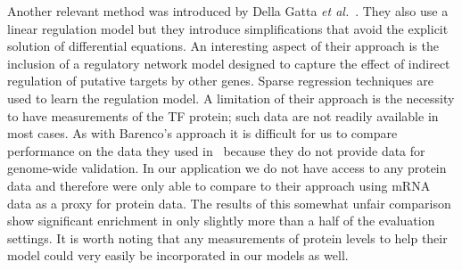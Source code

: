 \documentclass{pnastwo}
\begin{document}
\begin{article}
Another relevant method was introduced by Della Gatta {\em et
  al.}~\cite{Gatta2008}. They also use a linear regulation model but
they introduce simplifications that avoid the explicit solution of
differential equations. An interesting aspect of their approach is the
inclusion of a regulatory network model designed to capture the effect
of indirect regulation of putative targets by other genes. Sparse regression
techniques are used to learn the regulation model. A limitation of
their approach is the necessity to have measurements of the TF
protein; such data are not readily available in most cases. As with
Barenco's approach it is difficult for us to compare performance on
the data they used in~\cite{Gatta2008} because they do not provide data
for genome-wide validation. In our application we do not have
access to any protein data and therefore were only able to compare to
their approach using mRNA data as a proxy for protein data.
The results of this somewhat unfair comparison show significant
enrichment in only slightly more than a half of the evaluation
settings.
It is worth noting that any measurements of protein levels to help
their model could very easily be incorporated in our models as well.


\end{article}
\end{document}
